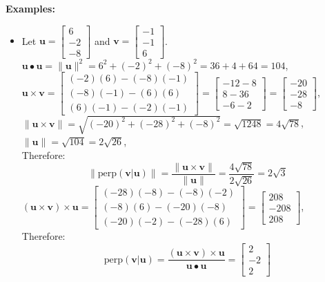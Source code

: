 \documentclass{article}
\begin{document}
\textbf{Examples:}
\begin{itemize}
\item Let \(\mathbf{u} = \begin{bmatrix} 6 \\ -2 \\ -8 \end{bmatrix}\) and \(\mathbf{v} = \begin{bmatrix} -1 \\ -1 \\ 6 \end{bmatrix}\). \\ 
\(\mathbf{u} \bullet \mathbf{u} = \|\mathbf{u}\|^2 = 6^2 + (-2)^2 + (-8)^2 = 36 + 4 + 64 = 104\), \\ 
\(\mathbf{u} \times \mathbf{v} = \begin{bmatrix} (-2)(6) - (-8)(-1) \\ (-8)(-1) - (6)(6) \\ (6)(-1) - (-2)(-1) \end{bmatrix} = \begin{bmatrix} -12 - 8 \\ 8 - 36 \\ -6 - 2 \end{bmatrix} = \begin{bmatrix} -20 \\ -28 \\ -8 \end{bmatrix}\), \\
\(\left\|\mathbf{u} \times \mathbf{v}\right\| = \sqrt{(-20)^2 + (-28)^2 + (-8)^2} = \sqrt{1248} = 4\sqrt{78}\), \\
\(\|\mathbf{u}\| = \sqrt{104} = 2\sqrt{26}\), \\
Therefore: \[\left\|\text{perp}(\mathbf{v} | \mathbf{u})\right\| = \frac{\left\|\mathbf{u} \times \mathbf{v}\right\|}{\|\mathbf{u}\|} = \frac{4\sqrt{78}}{2\sqrt{26}} = 2\sqrt{3}\] 
\((\mathbf{u} \times \mathbf{v}) \times \mathbf{u} = \begin{bmatrix} (-28)(-8) - (-8)(-2) \\ (-8)(6) - (-20)(-8) \\ (-20)(-2) - (-28)(6) \end{bmatrix} = \begin{bmatrix} 208 \\ -208 \\ 208 \end{bmatrix}\), \\
Therefore: \[\text{perp}(\mathbf{v} | \mathbf{u}) = \frac{(\mathbf{u} \times \mathbf{v}) \times \mathbf{u}}{\mathbf{u} \bullet \mathbf{u}} = \begin{bmatrix} 2 \\ -2 \\ 2 \end{bmatrix}\]
\end{itemize}
\end{document}
